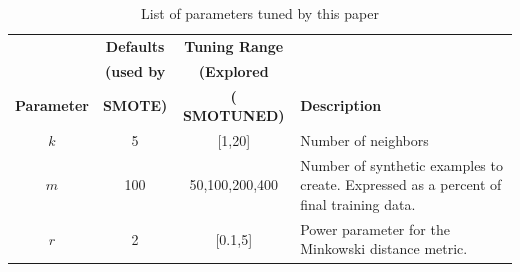 \documentclass[10pt,conference]{IEEEtran}
\theoremstyle{break}
\theoremstyle{break}
\begin{document}



\begin{table}[!t]
    \begin{center}
\scriptsize
\begin{tabular}{c|c|c|p{3cm}} 
        \textbf{} & \textbf{Defaults} & \textbf{Tuning Range} & \\
          & \textbf{(used by  } & \textbf{(Explored  } &  \\  
        \textbf{Parameter} & \textbf{ SMOTE)} & \textbf{( SMOTUNED)} &  \textbf{Description} \\
          
          
        \hline
        $k$ & 5 & [1,20] & Number of neighbors \\ 
        \hline
       $m$ & 100 & {50,100,200,400} & Number of synthetic examples to create. Expressed as a percent  of   final training data. \\ 
        \hline
        $r$ & 2 & [0.1,5] & Power parameter for the Minkowski distance metric.\\
 
\end{tabular}
\end{center}
\caption{List of parameters tuned by this paper}
\label{tb:tuned}
\end{table}
\end{document}
